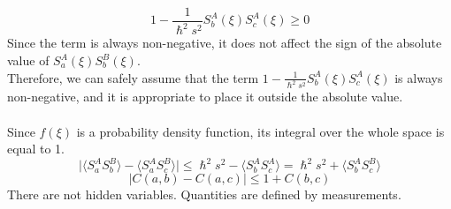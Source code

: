 \documentclass{article}
\begin{document}
$$1-\frac{1}{\hslash^2 s^2}S_b^A(\xi)S_c^A(\xi) \geq 0$$
Since the term is always non-negative, it does not affect the sign of the absolute value of $S_a^A(\xi)S_b^B(\xi)$. \\
Therefore, we can safely assume that the term $1-\frac{1}{\hslash^2 s^2}S_b^A(\xi)S_c^A(\xi)$ is always non-negative, and it is appropriate to place it outside the absolute value.\\ \\
Since $f(\xi)$ is a probability density function, its integral over the whole space is equal to 1.
$$\bigl| \langle S_a^AS_b^B \rangle - \langle S_a^AS_c^B \rangle  \bigl| \leq  \hslash^2s^2 -  \langle S_b^AS_c^A \rangle =  \hslash^2s^2  + \langle S_b^AS_c^B \rangle  $$
$$|C(a,b) -C(a,c)| \leq 1 +C(b,c)$$
There are not hidden variables. Quantities are defined by measurements.
\end{document}
